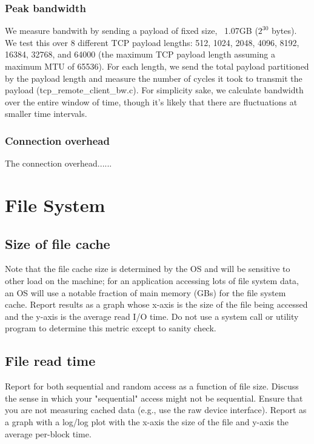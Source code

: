 \documentclass{article}
\begin{document}
\subsubsection{Peak bandwidth}

We measure bandwith by sending a payload of fixed size, ~1.07GB ($2^30$ bytes). We test this over 8 different TCP payload 
lengths: 512, 1024, 2048, 4096, 8192, 16384, 32768, and 64000 (the maximum TCP payload length assuming a maximum MTU of 65536).
For each length, we send the total payload partitioned by the payload length and measure the number of cycles it took to transmit
the payload (tcp\_remote\_client\_bw.c). For simplicity sake, we calculate bandwidth over the entire window of time, though it's 
likely that there are fluctuations at smaller time intervals. 

\subsubsection{Connection overhead}

The connection overhead......
 

\section{File System}
\subsection{Size of file cache} 

Note that the file cache size is determined by the OS and will be sensitive to other load on the machine; for an application accessing lots of file system data, an OS will use a notable fraction of main memory (GBs) for the file system cache. Report results as a graph whose x-axis is the size of the file being accessed and the y-axis is the average read I/O time. Do not use a system call or utility program to determine this metric except to sanity check.

\subsection{File read time} 

Report for both sequential and random access as a function of file size. Discuss the sense in which your "sequential" access might not be sequential. Ensure that you are not measuring cached data (e.g., use the raw device interface). Report as a graph with a log/log plot with the x-axis the size of the file and y-axis the average per-block time.
\end{document}
